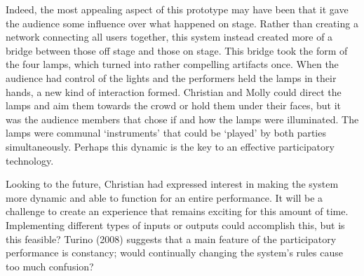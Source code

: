 Indeed, the most appealing aspect of this prototype may have been that it gave the audience some influence over what happened on stage. Rather than creating a network connecting all users together, this system instead created more of a bridge between those off stage and those on stage. This bridge took the form of the four lamps, which turned into rather compelling artifacts once. When the audience had control of the lights and the performers held the lamps in their hands, a new kind of interaction formed. Christian and Molly could direct the lamps and aim them towards the crowd or hold them under their faces, but it was the audience members that chose if and how the lamps were illuminated. The lamps were communal `instruments' that could be `played' by both parties simultaneously. Perhaps this dynamic is the key to an effective participatory technology.

Looking to the future, Christian had expressed interest in making the system more dynamic and able to function for an entire performance. It will be a challenge to create an experience that remains exciting for this amount of time. Implementing different types of inputs or outputs could accomplish this, but is this feasible? Turino (2008) suggests that a main feature of the participatory performance is constancy; would continually changing the system's rules cause too much confusion?


